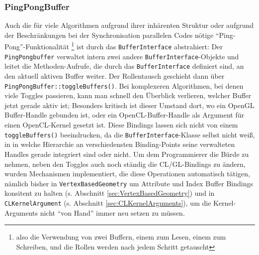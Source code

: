 	
	\subsubsection{PingPongBuffer}
	Auch die für viele Algorithmen aufgrund ihrer inhärenten Struktur oder aufgrund der Beschränkungen bei der 	
	Synchronisation parallelen Codes nötige "`Ping-Pong"'-Funktionalität \footnote{also die Verwendung von zwei Buffern, 
	einem zum Lesen, einem zum Schreiben, und die Rollen werden nach jedem Schritt getauscht} ist durch das
	\lstinline|BufferInterface| abstrahiert: Der \lstinline|PingPongbuffer| verwaltet intern zwei andere
	\lstinline|BufferInterface|-Objekte und leitet die Methoden-Aufrufe, die durch das \lstinline|BufferInterface| 
	definiert sind,	an den aktuell aktiven Buffer weiter. Der Rollentausch geschieht dann über 
	\lstinline|PingPongBuffer::toggleBuffers()|.
	Bei komplexeren Algorithmen, bei denen viele Toggles passieren, kann man schnell den Überblick verlieren, welcher
	Buffer jetzt gerade aktiv ist; Besonders kritisch ist dieser Umstand dort, wo ein OpenGL Buffer-Handle
	gebunden ist, oder ein OpenCL-Buffer-Handle als Argument für einen OpenCL-Kernel gesetzt ist.
	Diese Bindings lassen sich nicht von einem \lstinline|toggleBuffers()| beeindrucken, 
	da die \lstinline|BufferInterface|-Klasse selbst nicht weiß, in in welche Hierarchie an verschiedensten Binding-Points
	seine verwalteten Handles gerade integriert sind oder nicht.
	Um dem Programmierer die Bürde zu nehmen, neben den Toggles auch noch ständig die CL/GL-Bindings zu ändern,
	wurden Mechanismen implementiert, die diese Operationen automatisch tätigen, nämlich bisher in 
	\lstinline|VertexBasedGeometry| um Attribute und Index Buffer Bindings konsitent zu halten 
	(s. Abschnitt \ref{sec:VertexBasedGeometry}) und in
	\lstinline|CLKernelArgument| (s. Abschnitt \ref{sec:CLKernelArguments}), um die Kernel-Arguments nicht "`von Hand"'
	immer neu setzen zu müssen.
	